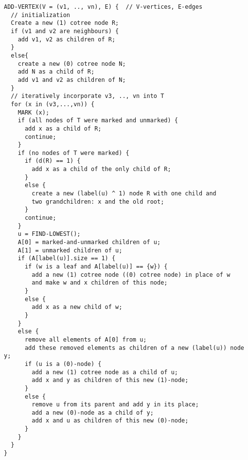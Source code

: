 \begin{verbatim}
ADD-VERTEX(V = (v1, .., vn), E) {  // V-vertices, E-edges 
  // initialization
  Create a new (1) cotree node R;
  if (v1 and v2 are neighbours) {
    add v1, v2 as children of R;
  }
  else{
    create a new (0) cotree node N;
    add N as a child of R; 
    add v1 and v2 as children of N;
  }
  // iteratively incorporate v3, .., vn into T
  for (x in (v3,...,vn)) {
    MARK (x);
    if (all nodes of T were marked and unmarked) {
      add x as a child of R;
      continue;
    }
    if (no nodes of T were marked) {
      if (d(R) == 1) {
        add x as a child of the only child of R;
      }
      else {
        create a new (label(u) ^ 1) node R with one child and
        two grandchildren: x and the old root;
      }
      continue;
    }
    u = FIND-LOWEST();
    A[0] = marked-and-unmarked children of u;
    A[1] = unmarked children of u;
    if (A[label(u)].size == 1) {
      if (w is a leaf and A[label(u)] == {w}) {
        add a new (1) cotree node ((0) cotree node) in place of w 
        and make w and x children of this node;
      }
      else {
        add x as a new child of w;
      }
    }
    else {
      remove all elements of A[0] from u; 
      add these removed elements as children of a new (label(u)) node y;
      if (u is a (0)-node) {
        add a new (1) cotree node as a child of u;
        add x and y as children of this new (1)-node;
      }
      else {
        remove u from its parent and add y in its place;
        add a new (0)-node as a child of y; 
        add x and u as children of this new (0)-node;
      }
    }
  }
}
\end{verbatim}